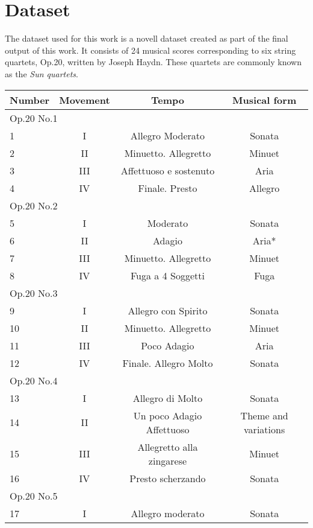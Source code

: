 \chapter{Dataset}
\label{chap:dataset}
The dataset used for this work is a novell dataset created as part of the final output of this work. It consists of 24 musical scores corresponding to six string quartets, Op.20, written by Joseph Haydn. These quartets are commonly known as the \emph{Sun quartets}.

\begin{table}[tbp]
\centering
\begin{tabular}{|l|c|c|c|}
\hline
Number & Movement & Tempo & Musical form \\ \hline
\multicolumn{4}{|l|}{Op.20 No.1} \\ \hline
1 & I & Allegro Moderato & Sonata \\ \hline
2 & II & Minuetto. Allegretto & Minuet \\ \hline
3 & III & Affettuoso e sostenuto & Aria \\ \hline
4 & IV & Finale. Presto & Allegro \\ \hline
\multicolumn{4}{|l|}{Op.20 No.2} \\ \hline
5 & I & Moderato & Sonata \\ \hline
6 & II & Adagio & Aria* \\ \hline
7 & III & Minuetto. Allegretto & Minuet \\ \hline
8 & IV & Fuga a 4 Soggetti & Fuga \\ \hline
\multicolumn{4}{|l|}{Op.20 No.3} \\ \hline
9 & I & Allegro con Spirito & Sonata \\ \hline
10 & II & Minuetto. Allegretto & Minuet \\ \hline
11 & III & Poco Adagio & Aria \\ \hline
12 & IV & Finale. Allegro Molto & Sonata \\ \hline
\multicolumn{4}{|l|}{Op.20 No.4} \\ \hline
13 & I & Allegro di Molto & Sonata \\ \hline
14 & II & Un poco Adagio Affettuoso & Theme and variations \\ \hline
15 & III & Allegretto alla zingarese & Minuet \\ \hline
16 & IV & Presto scherzando & Sonata \\ \hline
\multicolumn{4}{|l|}{Op.20 No.5} \\ \hline
17 & I & Allegro moderato & Sonata \\ \hline

\end{tabular}
\end{table}
